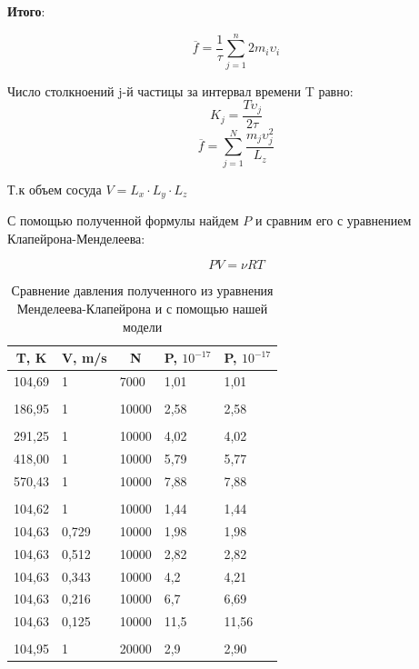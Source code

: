 \documentclass[twoside,twocolumn, 11pt]{article}
\theoremstyle{plain}
\theoremstyle{definition}
\begin{document}
\textbf{Итого}:

\begin{equation}
\overline{f} = \dfrac{1}{\tau} \sum_{j=1}^n 2 m_i \upsilon_i
\end{equation}

Число столкноений j-й частицы за интервал времени T равно:
\[K_j = \dfrac{T \upsilon_j }{2\tau} \]
\[\overline{f} = \sum_{j = 1}^N \dfrac{m_j \upsilon_j^2}{L_z}\]

Т.к объем сосуда $V = L_x \cdot L_y \cdot L_z$

\begin{center}
\end{center}

\indent С помощью полученной формулы найдем $P$ и сравним его с уравнением Клапейрона-Менделеева:

\[PV = \nu R T \]

\begin{table}[h!]
\centering
\label{Table 1}
\begin{tabular}{|l|l|l|l|l|}
\hline
\multicolumn{1}{|c|}{T, K} & \multicolumn{1}{c|}{V, m/s} & \multicolumn{1}{c|}{N} & \multicolumn{1}{c|}{P, $10^{-17}$} & \multicolumn{1}{c|}{P, $10^{-17}$} \\ \hline
104,69 & 1 & 7000 & 1,01 & 1,01                                    \\
& & & &                                         \\
186,95 & 1 & 10000 & 2,58 & 2,58                                    \\
& & & &                                         \\
291,25 & 1 & 10000 & 4,02 & 4,02                                    \\
418,00 & 1 & 10000 & 5,79 & 5,77                                    \\
570,43 & 1 & 10000 & 7,88 & 7,88                                    \\
& & & &                                         \\
104,62 & 1 & 10000 & 1,44 & 1,44                                    \\
104,63 & 0,729 & 10000 & 1,98 & 1,98                                    \\
104,63 & 0,512 & 10000 & 2,82 & 2,82                                    \\
104,63 & 0,343 & 10000 & 4,2 & 4,21                                    \\
104,63 & 0,216 & 10000 & 6,7 & 6,69                                    \\
104,63 & 0,125 & 10000 & 11,5 & 11,56                                   \\
& & & &                                         \\
104,95 & 1 & 20000 & 2,9 & 2,90                                    \\ \hline
\end{tabular}
\caption{Сравнение давления полученного из уравнения Менделеева-Клапейрона и с помощью нашей модели}
\end{table}
\end{document}
